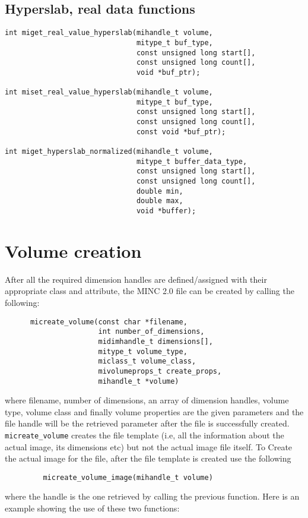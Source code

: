 \documentclass{article}
\begin{document}
\subsection{Hyperslab, real data functions}
\begin{verbatim}
int miget_real_value_hyperslab(mihandle_t volume,
                               mitype_t buf_type,
                               const unsigned long start[],
                               const unsigned long count[],
                               void *buf_ptr);

int miset_real_value_hyperslab(mihandle_t volume,
                               mitype_t buf_type,
                               const unsigned long start[],
                               const unsigned long count[],
                               const void *buf_ptr);

int miget_hyperslab_normalized(mihandle_t volume, 
                               mitype_t buffer_data_type,
                               const unsigned long start[], 
                               const unsigned long count[],
                               double min, 
                               double max, 
                               void *buffer);
\end{verbatim}

\section{Volume creation}
After all the required dimension handles are defined/assigned with their appropriate 
class and attribute, the MINC 2.0 file can be created by calling the following:
\begin{verbatim}
      micreate_volume(const char *filename, 
                      int number_of_dimensions,
                      midimhandle_t dimensions[], 
                      mitype_t volume_type,
                      miclass_t volume_class, 
                      mivolumeprops_t create_props,
                      mihandle_t *volume)
\end{verbatim}
where filename, number of dimensions, an array of dimension handles, volume type, 
volume class and finally volume properties are the given parameters and the file handle
will be the  retrieved parameter after the file is successfully created.
{\tt micreate\_volume} creates the file template (i.e, all the information about the actual
image, its dimensions etc) but not the actual image file itself.
To Create the actual image for the file, after the file template is created use the following
\begin{verbatim}
         micreate_volume_image(mihandle_t volume)
\end{verbatim}
where the handle is the one retrieved by calling the previous function.    
Here is an example showing the use of these two functions:
\end{document}
